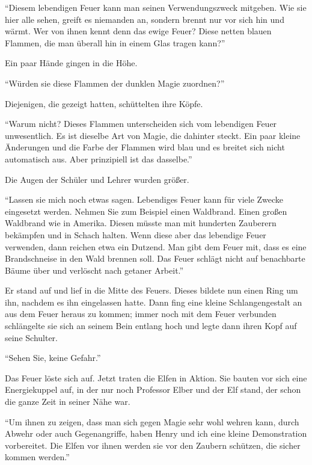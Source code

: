 \enquote{Diesem lebendigen Feuer kann man seinen Verwendungszweck mitgeben. Wie sie hier alle sehen, greift es niemanden an, sondern brennt nur vor sich hin und wärmt. \gst Wer von ihnen kennt denn das ewige Feuer? Diese netten blauen Flammen, die man überall hin in einem Glas tragen kann?}

Ein paar Hände gingen in die Höhe.

\enquote{Würden sie diese Flammen der dunklen Magie zuordnen?}

Diejenigen, die gezeigt hatten, schüttelten ihre Köpfe.

\enquote{Warum nicht? Dieses Flammen unterscheiden sich vom lebendigen Feuer unwesentlich. Es ist dieselbe Art von Magie, die dahinter steckt. Ein paar kleine Änderungen und die Farbe der Flammen wird blau und es breitet sich nicht automatisch aus. Aber prinzipiell ist das dasselbe.}

Die Augen der Schüler und Lehrer wurden größer.

\enquote{Lassen sie mich noch etwas sagen. Lebendiges Feuer kann für viele Zwecke eingesetzt werden. Nehmen Sie zum Beispiel einen Waldbrand. Einen großen Waldbrand wie in Amerika. Diesen müsste man mit hunderten Zauberern bekämpfen und in Schach halten. Wenn diese aber das lebendige Feuer verwenden, dann reichen etwa ein Dutzend. Man gibt dem Feuer mit, dass es eine Brandschneise in den Wald brennen soll. Das Feuer schlägt nicht auf benachbarte Bäume über und verlöscht nach getaner Arbeit.}

Er stand auf und lief in die Mitte des Feuers. Dieses bildete nun einen Ring um ihn, nachdem es ihn eingelassen hatte. Dann fing eine kleine Schlangengestalt an aus dem Feuer heraus zu kommen; immer noch mit dem Feuer verbunden schlängelte sie sich an seinem Bein entlang hoch und legte dann ihren Kopf auf seine Schulter.

\enquote{Sehen Sie, keine Gefahr.}

Das Feuer löste sich auf. Jetzt traten die Elfen in Aktion. Sie bauten vor sich eine Energiekuppel auf, in der nur noch Professor Elber und der Elf stand, der schon die ganze Zeit in seiner Nähe war.

\enquote{Um ihnen zu zeigen, dass man sich gegen  Magie sehr wohl wehren kann, durch Abwehr oder auch Gegenangriffe, haben Henry und ich eine kleine Demonstration vorbereitet. Die Elfen vor ihnen werden sie vor den Zaubern schützen, die sicher kommen werden.}

